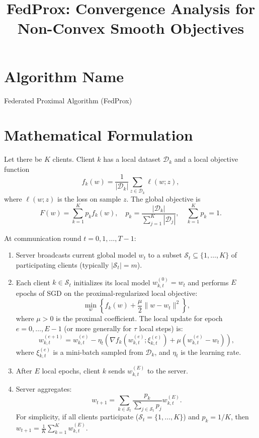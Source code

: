 \documentclass{article}
\title{FedProx: Convergence Analysis for Non-Convex Smooth Objectives}
\author{}
\date{}
\begin{document}
\maketitle

\section*{Algorithm Name}
Federated Proximal Algorithm (FedProx)

\section*{Mathematical Formulation}

Let there be $K$ clients. Client $k$ has a local dataset $\mathcal{D}_k$ and a local objective function
\begin{equation}
    f_k(w) = \frac{1}{|\mathcal{D}_k|} \sum_{z \in \mathcal{D}_k} \ell(w; z),
\end{equation}
where $\ell(w; z)$ is the loss on sample $z$. The global objective is
\begin{equation}
    F(w) = \sum_{k=1}^K p_k f_k(w), \quad p_k = \frac{|\mathcal{D}_k|}{\sum_{j=1}^K |\mathcal{D}_j|}, \quad \sum_{k=1}^K p_k = 1.
\end{equation}

At communication round $t = 0, 1, \dots, T-1$:
\begin{enumerate}
    \item Server broadcasts current global model $w_t$ to a subset $\mathcal{S}_t \subseteq \{1,\dots,K\}$ of participating clients (typically $|\mathcal{S}_t| = m$).
    \item Each client $k \in \mathcal{S}_t$ initializes its local model $w_{k,t}^{(0)} = w_t$ and performs $E$ epochs of SGD on the proximal-regularized local objective:
    \begin{equation}
        \min_{w} \left\{ f_k(w) + \frac{\mu}{2} \| w - w_t \|^2 \right\},
    \end{equation}
    where $\mu > 0$ is the proximal coefficient. The local update for epoch $e = 0, \dots, E-1$ (or more generally for $\tau$ local steps) is:
    \begin{equation}
        w_{k,t}^{(e+1)} = w_{k,t}^{(e)} - \eta_t \left( \nabla f_k(w_{k,t}^{(e)}; \xi_{k,t}^{(e)}) + \mu (w_{k,t}^{(e)} - w_t) \right),
    \end{equation}
    where $\xi_{k,t}^{(e)}$ is a mini-batch sampled from $\mathcal{D}_k$, and $\eta_t$ is the learning rate.
    \item After $E$ local epochs, client $k$ sends $w_{k,t}^{(E)}$ to the server.
    \item Server aggregates:
    \begin{equation}
        w_{t+1} = \sum_{k \in \mathcal{S}_t} \frac{p_k}{\sum_{j \in \mathcal{S}_t} p_j} w_{k,t}^{(E)}.
    \end{equation}
    For simplicity, if all clients participate ($\mathcal{S}_t = \{1,\dots,K\}$) and $p_k = 1/K$, then $w_{t+1} = \frac{1}{K} \sum_{k=1}^K w_{k,t}^{(E)}$.
\end{enumerate}
\end{document}
